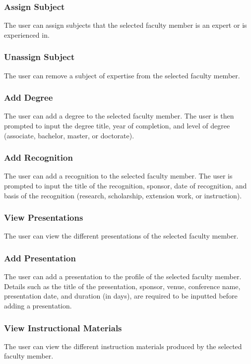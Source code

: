     	\subsubsection{Assign Subject}
    	The user can assign subjects that the selected faculty member is an expert or is experienced in.
    	
    	\subsubsection{Unassign Subject}
    	The user can remove a subject of expertise from the selected faculty member.
    	
    	\subsubsection{Add Degree}
    	The user can add a degree to the selected faculty member. The user is then prompted to input the degree title, year of completion, and level of degree (associate, bachelor, master, or doctorate).
    	
    	\subsubsection{Add Recognition}
    	The user can add a recognition to the selected faculty member. The user is prompted to input the title of the recognition, sponsor, date of recognition, and basis of the recognition (research, scholarship, extension work, or instruction).
    	
    	\subsubsection{View Presentations}
    	The user can view the different presentations of the selected faculty member.
    	
    	\subsubsection{Add Presentation}
    	The user can add a presentation to the profile of the selected faculty member. Details such as the title of the presentation, sponsor, venue, conference name, presentation date, and duration (in days), are required to be inputted before adding a presentation.
    	
    	\subsubsection{View Instructional Materials}
    	The user can view the different instruction materials produced by the selected faculty member.
    	
